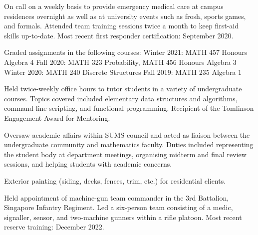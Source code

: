 \smallskip
On call on a weekly basis to provide emergency medical care at campus residences overnight as well as at
university events such as frosh, sports games, and formals. Attended team training sessions twice a month to keep
first-aid skills up-to-date. Most recent first responder certification: September 2020.
\medbreak

\smallskip
Graded assignments in the following courses:
\begingroup\parindent=10pt
\smallskip
\thing Winter 2021: MATH 457 Honours Algebra 4
\smallskip
\thing Fall 2020: MATH 323 Probability, MATH 456 Honours Algebra 3
\smallskip
\thing Winter 2020: MATH 240 Discrete Structures
\smallskip
\thing Fall 2019: MATH 235 Algebra 1
\endgroup
\medbreak

\smallskip
Held twice-weekly office hours to tutor students in a variety of undergraduate courses.
Topics covered included elementary data structures and algorithms, command-line scripting,
and functional programming. Recipient of the Tomlinson Engagement Award for Mentoring.
\medbreak

\smallskip
Oversaw academic affairs within {\mc SUMS} council and acted as liaison between the undergraduate community and
mathematics faculty. Duties included representing the student body at department meetings,
organising midterm and final review sessions,
and helping students with
academic concerns.
\medbreak

\smallskip
Exterior painting (siding, decks, fences, trim, etc.) for residential clients.
\medbreak

\smallskip
Held appointment of machine-gun team commander in the 3rd Battalion, Singapore Infantry Regiment.
Led a six-person team consisting of a medic, signaller, sensor, and two-machine gunners within a rifle platoon.
Most recent reserve training: December 2022.
\medbreak

